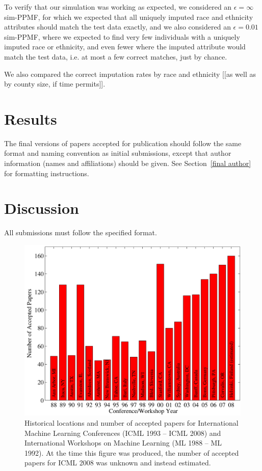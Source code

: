 \documentclass{article}
\begin{document}
To verify that our simulation was working as expected, we considered an $\epsilon=\infty$ sim-PPMF, for which we expected that all uniquely imputed race and ethnicity attributes should match the test data exactly, and we also considered an $\epsilon=0.01$ sim-PPMF, where we expected to find very few individuals with a uniquely imputed race or ethnicity, and even fewer where the imputed attribute would match the test data, i.e. at most a few correct matches, just by chance.

We also compared the correct imputation rates by race and ethnicity [[as well as by county size, if time permits]].


\section{Results}

The final versions of papers accepted for publication should follow the
same format and naming convention as initial submissions, except that
author information (names and affiliations) should be given. See
Section~\ref{final author} for formatting instructions.

\section{Discussion}

All submissions must follow the specified format.

\begin{figure}[ht]
\vskip 0.2in
\begin{center}
\centerline{\includegraphics[width=\columnwidth]{icml_numpapers}}
\caption{Historical locations and number of accepted papers for International
Machine Learning Conferences (ICML 1993 -- ICML 2008) and International
Workshops on Machine Learning (ML 1988 -- ML 1992). At the time this figure was
produced, the number of accepted papers for ICML 2008 was unknown and instead
estimated.}
\label{icml-historical}
\end{center}
\vskip -0.2in
\end{figure}
\end{document}
